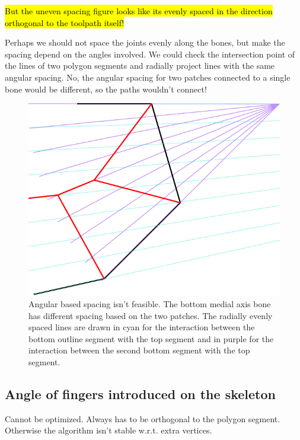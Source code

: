 \hl{But the uneven spacing figure looks like its evenly spaced in the direction orthogonal to the toolpath itself!}

Perhaps we should not space the joints evenly along the bones, but make the spacing depend on the angles involved.
We could check the intersection point of the lines of two polygon segments and radially project lines with the same angular spacing.
No, the angular spacing for two patches connected to a single bone would be different, so the paths wouldn't connect!

\begin{figure}[H]
\centering
\includegraphics[width=.9\columnwidth]{sources/method/angular_based_spacing.pdf}
\caption{Angular based spacing isn't feasible. The bottom medial axis bone has different spacing based on the two patches. The radially evenly spaced lines are drawn in cyan for the interaction between the bottom outline segment with the top segment and in purple for the interaction between the second bottom segment with  the top segment.}
\label{angular_based_spacing}
\end{figure}



\subsection{Angle of fingers introduced on the skeleton}
Cannot be optimized.
Always has to be orthogonal to the polygon segment.
Otherwise the algorithm isn't stable w.r.t. extra vertices.

